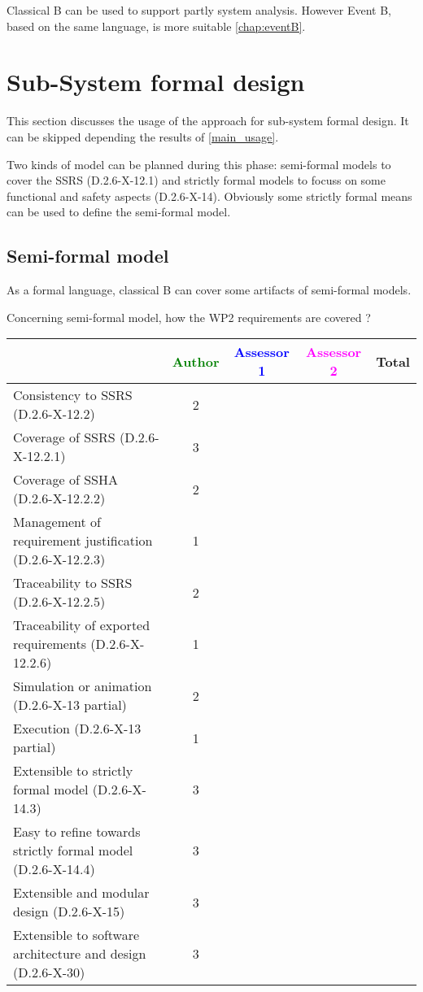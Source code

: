 \begin{author_comment}
Classical B can be used to  support partly  system analysis. However Event B, based on the same language, is more suitable \ref{chap:eventB}.
\end{author_comment}

\section{Sub-System formal design}
This section discusses the usage of the approach for sub-system formal design.
It can be skipped depending the results of \ref{main_usage}.

Two kinds of model can be planned during this phase: semi-formal models to  cover the SSRS (D.2.6-X-12.1) and strictly formal  models to  focuss on some functional and safety aspects (D.2.6-X-14).  Obviously some strictly  formal means can be used to define the semi-formal  model.

\subsection{Semi-formal model}


\begin{author_comment}
As a formal language, classical B  can cover some artifacts of semi-formal models.
\end{author_comment}

Concerning semi-formal model, how the WP2 requirements are covered ?

\begin{tabular}{|l | c | c | c | c|}
\hline
& \textcolor{green}{Author} & \textcolor{blue}{Assessor 1} & \textcolor{magenta}{Assessor 2} & Total \\
\hline 
Consistency to SSRS (D.2.6-X-12.2) & 2 & & &  \\
\hline
Coverage of SSRS (D.2.6-X-12.2.1)  & 3 & & &  \\
\hline
Coverage of SSHA (D.2.6-X-12.2.2)  & 2 & & &  \\
\hline
Management of requirement justification (D.2.6-X-12.2.3)  & 1 & & &  \\
\hline
Traceability to  SSRS (D.2.6-X-12.2.5)  & 2 & & &  \\
\hline
Traceability of exported requirements (D.2.6-X-12.2.6)  & 1 & & &  \\
\hline
Simulation or animation (D.2.6-X-13 partial)  & 2 & & &  \\
\hline
Execution (D.2.6-X-13 partial)  & 1 & & &  \\
\hline
Extensible to strictly formal model (D.2.6-X-14.3) & 3 & & &  \\
\hline
Easy to  refine towards strictly formal model (D.2.6-X-14.4) & 3 & & &  \\
\hline
Extensible and modular design (D.2.6-X-15)  & 3 & & &  \\
\hline
Extensible to software architecture and design (D.2.6-X-30)   & 3 & & &  \\
\hline
\end{tabular}


